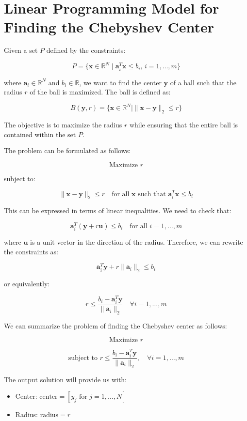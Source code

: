 \documentclass{article}
\begin{document}
\section*{Linear Programming Model for Finding the Chebyshev Center}

Given a set \( P \) defined by the constraints:

\[
P = \{ \mathbf{x} \in \mathbb{R}^N \mid \mathbf{a}_i^T \mathbf{x} \leq b_i, \, i = 1, \ldots, m \}
\]

where \( \mathbf{a}_i \in \mathbb{R}^N \) and \( b_i \in \mathbb{R} \), we want to find the center \( \mathbf{y} \) of a ball such that the radius \( r \) of the ball is maximized. The ball is defined as:

\[
B(\mathbf{y}, r) = \{ \mathbf{x} \in \mathbb{R}^N \mid \|\mathbf{x} - \mathbf{y}\|_2 \leq r \}
\]

The objective is to maximize the radius \( r \) while ensuring that the entire ball is contained within the set \( P \).

The problem can be formulated as follows:

\[
\text{Maximize } r
\]

subject to:

\[
\|\mathbf{x} - \mathbf{y}\|_2 \leq r \quad \text{for all } \mathbf{x} \text{ such that } \mathbf{a}_i^T \mathbf{x} \leq b_i
\]

This can be expressed in terms of linear inequalities. We need to check that:

\[
\mathbf{a}_i^T (\mathbf{y} + r \mathbf{u}) \leq b_i \quad \text{for all } i = 1, \ldots, m
\]

where \( \mathbf{u} \) is a unit vector in the direction of the radius. Therefore, we can rewrite the constraints as:

\[
\mathbf{a}_i^T \mathbf{y} + r \|\mathbf{a}_i\|_2 \leq b_i
\]

or equivalently:

\[
r \leq \frac{b_i - \mathbf{a}_i^T \mathbf{y}}{\|\mathbf{a}_i\|_2} \quad \forall i = 1, \ldots, m
\]

We can summarize the problem of finding the Chebyshev center as follows:

\[
\text{Maximize } r
\]

\[
\text{subject to } r \leq \frac{b_i - \mathbf{a}_i^T \mathbf{y}}{\|\mathbf{a}_i\|_2}, \quad \forall i = 1, \ldots, m
\]

The output solution will provide us with:

\begin{itemize}
    \item Center: \( \text{center} = [y_j \text{ for } j = 1, \ldots, N] \)
    \item Radius: \( \text{radius} = r \)
\end{itemize}
\end{document}
